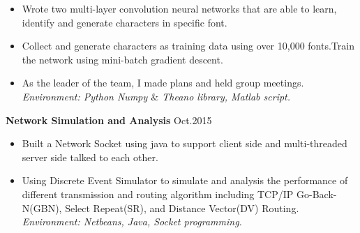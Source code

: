 \documentclass{resume} %
\begin{document}
\begin{spacing}{1}
\begin{center}
\begin{itemize}
\item{Wrote two multi-layer convolution neural networks that are able to learn, identify and generate characters in specific font. } \\
\item{Collect and generate characters as training data using over 10,000 fonts.Train the network using mini-batch gradient descent. } \\
\item{As the leader of the team, I made plans and held group meetings. } \\
\hspace{-9mm}\textit{Environment: Python Numpy $\&$ Theano library, Matlab script.}
\vspace{-1mm}
\end{itemize}

{\bf Network Simulation and Analysis} \hfill {\small Oct.2015} \\
\vspace{-0mm}
\begin{itemize}
\item{Built a Network Socket using java to support client side and multi-threaded server side talked to each other. } \\
\item{Using Discrete Event Simulator to simulate and analysis the performance of different transmission and routing algorithm including TCP/IP Go-Back-N(GBN), Select Repeat(SR), and Distance Vector(DV) Routing. } \\
\hspace{-9mm}\textit{Environment: Netbeans, Java, Socket programming.}
\vspace{-1mm}
\end{itemize}


\end{center}
\end{spacing}
\end{document}
